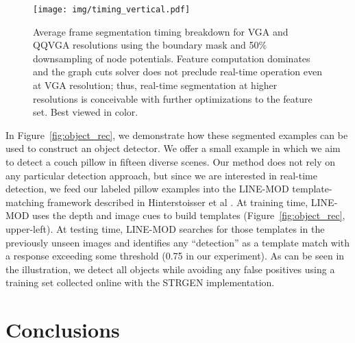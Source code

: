 \documentclass[journal]{IEEEtran}
\newcommand{\vga}{VGA\xspace}
\newcommand{\qqvga}{QQVGA\xspace}
\newcommand{\todoCR}[1]{}
\begin{document}
\todoCR{We should report how many frames were in the training set and how many clicks were necessary.  It'd be much better if we could do the viewpoint variation thing so that the number is very small.}

\begin{figure}
  \centering
  \texttt{[image: img/timing\_vertical.pdf]}
  \caption{Average frame segmentation timing breakdown for \vga and \qqvga resolutions using the boundary mask and 50\% downsampling of node potentials.  Feature computation dominates and the graph cuts solver does not preclude real-time operation even at \vga resolution; thus, real-time segmentation at higher resolutions is conceivable with further optimizations to the feature set. Best viewed in color. \todoCR{Should probably collect a 640x480 dataset, make a scaled-down copy, and compute timing results for that data.  This way, you can make an exact comparison.  As it is, the two sets of sequences are not exactly the same.  The reported claims are supported by the current plot, but it'd be nice for one to be able to make the comparison between the two total times.}}
  \label{fig:timing}
\end{figure}

In Figure~\ref{fig:object_rec}, we demonstrate how these segmented examples can be used to construct an object detector.  We offer a small example in which we aim to detect a couch pillow in fifteen diverse scenes. Our method does not rely on any particular detection approach, but since we are interested in real-time detection, we feed our labeled pillow examples into the LINE-MOD template-matching framework described in Hinterstoisser et al \cite{hinterstoisser2011a}. At training time, LINE-MOD uses the depth and image cues to build templates (Figure~\ref{fig:object_rec}, upper-left). At testing time, LINE-MOD searches for those templates in the previously unseen images and identifies any ``detection'' as a template match with a response exceeding some threshold (0.75 in our experiment).  As can be seen in the illustration, we detect all objects while avoiding any false positives using a training set collected online with the STRGEN implementation.

\section{Conclusions}
\end{document}
